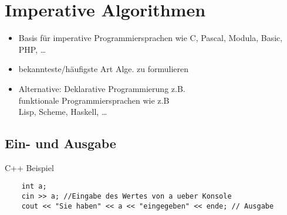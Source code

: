 \section{Imperative Algorithmen}
\begin{itemize}
 \item Basis für imperative Programmiersprachen wie C, Pascal, Modula, Basic, PHP, \dots \\
 \item bekannteste/häufigste Art Alge. zu formulieren
 \item Alternative: Deklarative Programmierung z.B. \\
 funktionale Programmiersprachen wie z.B \\
 Lisp, Scheme, Haskell, \dots
\end{itemize}

\subsection{Ein- und Ausgabe}
 C++ Beispiel
 \begin{lstlisting}
 	int a;
  	cin >> a; //Eingabe des Wertes von a ueber Konsole
  	cout << "Sie haben" << a << "eingegeben" << ende; // Ausgabe
 \end{lstlisting}

